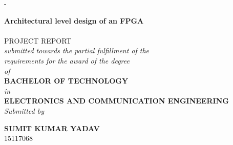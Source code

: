 \begin{titlingpage}
\begin{SingleSpace}
\calccentering{\unitlength}
\begin{adjustwidth*}{\unitlength}{-\unitlength}
\vspace*{-1.5 cm}
\begin{center}
{\LARGE \textbf{Architectural level design of an FPGA}}\\
\vspace{1mm}
{\Large \textbf{}}\\[4mm]
\vspace{0.5 cm}
{\large PROJECT REPORT\\ \emph{submitted towards the partial fulfillment of the\\ \vspace{1 mm} requirements for the award of the degree \\ \vspace{1 mm} of}}\\
\vspace{5 mm}
{\large \textbf{BACHELOR OF TECHNOLOGY} \vspace{3 mm} \\\emph{in}\\\vspace{3 mm} \textbf{ELECTRONICS AND COMMUNICATION ENGINEERING}}\\
\vspace{4 mm}
\vspace{2 mm}
{\large \emph{Submitted by}}\\
\vspace{5mm}

\begin{minipage}[t]{0.4\textwidth}
\begin{center} \large
{\large\textbf{SUMIT KUMAR YADAV}}\\
{15117068} %
\end{center}
\end{minipage}


\end{center}
\end{adjustwidth*}
\end{SingleSpace}
\end{titlingpage}
